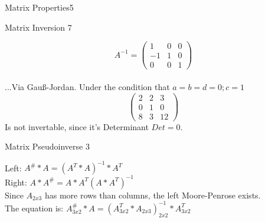 \begin{questions}
\begin{question}{Matrix Properties}{5}
\begin{answer}
	\end{answer}
		
	\end{question}
	\begin{question}{Matrix Inversion }{7}		
	\begin{answer} 
 \begin{equation*}
		A^{-1} =\begin{pmatrix}
			 1 & 0 & 0 \\
			-1 & 1 & 0 \\
			 0 & 0 & 1
		\end{pmatrix}
	\end{equation*} \\
	...Via Gau\ss-Jordan. Under the condition that $a=b=d=0; c=1$\\
	\begin{equation*}
		\begin{pmatrix}
			2 & 2 &  3 \\
			0 & 1 &  0 \\
			8 & 3 & 12
		\end{pmatrix}
	\end{equation*}
	Is not invertable, since it's Determinant $Det = 0$.
	\end{answer}
		
	\end{question}
	\begin{question}{Matrix Pseudoinverse }{3}		
	\begin{answer} 
			Left: $A^\# * A = (A^T * A)^{-1} * A^T$ \\
	Right: $A * A^\# = A * A^T (A * A^T)^{-1}$\\
	Since $A_{2x3}$ has more rows than columns, the left Moore-Penrose exists.\\
	The equation is: $A^\#_{3x2} * A = (A^T_{3x2} * A_{2x3})^{-1}_{2x2} * A^T_{3x2}$
	\end{answer}
		

\end{question}
\end{questions}
